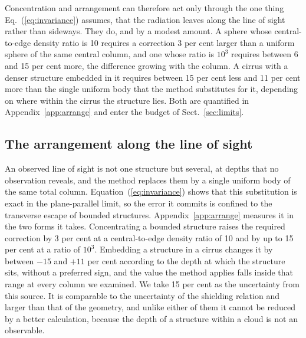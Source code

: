 Concentration and arrangement can therefore act only through the one thing Eq.~(\ref{eq:invariance}) assumes, that the radiation
leaves along the line of sight rather than sideways. They do, and by a modest amount. A sphere whose central-to-edge density ratio
is 10 requires a correction 3 per cent larger than a uniform sphere of the same central column, and one whose ratio is $10^3$
requires between 6 and 15 per cent more, the difference growing with the column. A cirrus with a denser structure embedded in it
requires between 15 per cent less and 11 per cent more than the single uniform body that the method substitutes for it, depending
on where within the cirrus the structure lies. Both are quantified in Appendix~\ref{app:arrange} and enter the budget of
Sect.~\ref{sec:limits}.



\subsection{The arrangement along the line of sight}

An observed line of sight is not one structure but several, at depths that no observation reveals, and the method replaces them by
a single uniform body of the same total column. Equation~(\ref{eq:invariance}) shows that this substitution is exact in the
plane-parallel limit, so the error it commits is confined to the transverse escape of bounded structures.
Appendix~\ref{app:arrange} measures it in the two forms it takes. Concentrating a bounded structure raises the required correction
by 3 per cent at a central-to-edge density ratio of 10 and by up to 15 per cent at a ratio of $10^3$. Embedding a structure in a
cirrus changes it by between $-15$ and $+11$ per cent according to the depth at which the structure sits, without a preferred
sign, and the value the method applies falls inside that range at every column we examined. We take 15 per cent as the
uncertainty from this source. It is comparable to the uncertainty of the shielding relation and larger than that of the geometry,
and unlike either of them it cannot be reduced by a better calculation, because the depth of a structure within a cloud is not an
observable.


